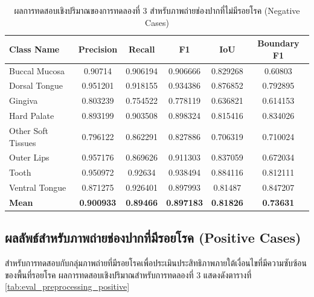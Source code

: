 \begin{table}[H]
\centering
\caption{ผลการทดสอบเชิงปริมาณของการทดลองที่ 3 สำหรับภาพถ่ายช่องปากที่ไม่มีรอยโรค (Negative Cases)}
\label{tab:eval_preprocessing_negative}
\begin{tabular}{|l|c|c|c|c|c|}
\hline
\textbf{Class Name} & \textbf{Precision} & \textbf{Recall} & \textbf{F1} & \textbf{IoU} & \textbf{Boundary F1} \\ \hline
Buccal Mucosa & 0.90714 & 0.906194 & 0.906666 & 0.829268 & 0.60803 \\
Dorsal Tongue & 0.951201 & 0.918155 & 0.934386 & 0.876852 & 0.792895 \\
Gingiva & 0.803239 & 0.754522 & 0.778119 & 0.636821 & 0.614153 \\
Hard Palate & 0.893199 & 0.903508 & 0.898324 & 0.815416 & 0.834026 \\
Other Soft Tissues & 0.796122 & 0.862291 & 0.827886 & 0.706319 & 0.710024 \\
Outer Lips & 0.957176 & 0.869626 & 0.911303 & 0.837059 & 0.672034 \\
Tooth & 0.950972 & 0.92634 & 0.938494 & 0.884116 & 0.812111 \\
Ventral Tongue & 0.871275 & 0.926401 & 0.897993 & 0.81487 & 0.847207 \\ \hline
\textbf{Mean} & \textbf{0.900933} & \textbf{0.89466} & \textbf{0.897183} & \textbf{0.81826} & \textbf{0.73631} \\ \hline
\end{tabular}
\end{table}

\subsection{ผลลัพธ์สำหรับภาพถ่ายช่องปากที่มีรอยโรค (Positive Cases)}
สำหรับการทดสอบกับกลุ่มภาพถ่ายที่มีรอยโรคเพื่อประเมินประสิทธิภาพภายใต้เงื่อนไขที่มีความซับซ้อนของพื้นที่รอยโรค ผลการทดสอบเชิงปริมาณสำหรับการทดลองที่ 3 แสดงดังตารางที่ \ref{tab:eval_preprocessing_positive}


